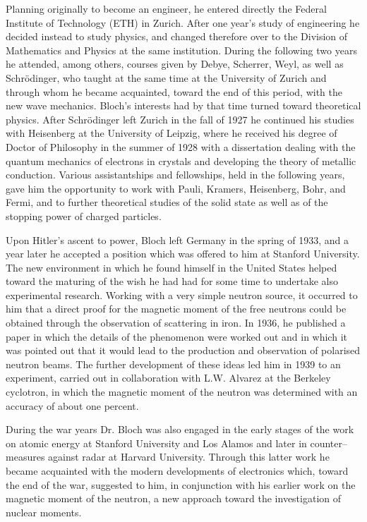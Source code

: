 Planning originally to become an engineer, he entered directly the Federal Institute of Technology (ETH) in Zurich. After one year's study of engineering he decided instead to study physics, and changed therefore over to the Division of Mathematics and Physics at the same institution. During the following two years he attended, among others, courses given by Debye, Scherrer, Weyl, as well as Schr\"{o}dinger, who taught at the same time at the University of Zurich and through whom he became acquainted, toward the end of this period, with the new wave mechanics. Bloch's interests had by that time turned toward theoretical physics. After Schr\"{o}dinger left Zurich in the fall of 1927 he continued his studies with Heisenberg at the University of Leipzig, where he received his degree of Doctor of Philosophy in the summer of 1928 with a dissertation dealing with the quantum mechanics of electrons in crystals and developing the theory of metallic conduction. Various assistantships and fellowships, held in the following years, gave him the opportunity to work with Pauli, Kramers, Heisenberg, Bohr, and Fermi, and to further theoretical studies of the solid state as well as of the stopping power of charged particles.
 
Upon Hitler's ascent to power, Bloch left Germany in the spring of 1933, and a year later he accepted a position which was offered to him at Stanford University. The new environment in which he found himself in the United States helped toward the maturing of the wish he had had for some time to undertake also experimental research. Working with a very simple neutron source, it occurred to him that a direct proof for the magnetic moment of the free neutrons could be obtained through the observation of scattering in iron. In 1936, he published a paper in which the details of the phenomenon were worked out and in which it was pointed out that it would lead to the production and observation of polarised neutron beams. The further development of these ideas led him in 1939 to an experiment, carried out in collaboration with L.W. Alvarez at the Berkeley cyclotron, in which the magnetic moment of the neutron was determined with an accuracy of about one percent.
 
During the war years Dr. Bloch was also engaged in the early stages of the work on atomic energy at Stanford University and Los Alamos and later in counter--measures against radar at Harvard University. Through this latter work he became acquainted with the modern developments of electronics which, toward the end of the war, suggested to him, in conjunction with his earlier work on the magnetic moment of the neutron, a new approach toward the investigation of nuclear moments.
 
